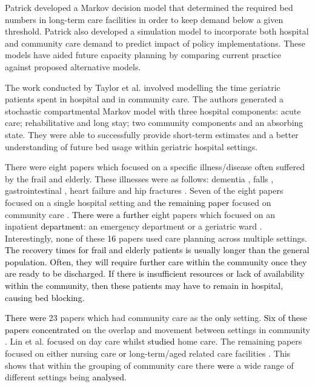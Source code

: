 \documentclass[../thesis.tex]{subfiles}
\begin{document}
Patrick \cite{Patrick} developed a Markov decision model that determined the required bed numbers in long-term care facilities in order to keep demand below a given threshold. Patrick also developed a simulation model to incorporate both hospital and community care demand to predict impact of policy implementations. These models have aided future capacity planning by comparing current practice against proposed alternative models.

The work conducted by Taylor et al. \cite{Taylor} involved modelling the time geriatric patients spent in hospital and in community care. The authors generated a stochastic compartmental Markov model with three hospital components: acute care; rehabilitative and long stay; two community components and an absorbing state. They were able to successfully provide short-term estimates and a better understanding of future bed usage within geriatric hospital settings.

There were eight papers which focused on a specific illness/disease often suffered by the frail and elderly. These illnesses were as follows: dementia \cite{Cepoiu}, falls \cite{Franklin}, gastrointestinal \cite{Abe}, heart failure \cite{Azad, Kul, Shaw} and hip fractures \cite{Beaupre, Wallace}. Seven of the eight papers focused on a single hospital setting and \textcolor{black}{the remaining paper} focused on community care \cite{Cepoiu}. \textcolor{black}{There were a further} eight papers which focused on an inpatient \textcolor{black}{department}\textcolor{black}{:} an emergency department \cite{Patrick, Rashwan, Rossille,Trevisan} or a geriatric ward \cite{Christodoulou, Franck, Gorunescu,Marshall3}. Interestingly, none of these \textcolor{black}{16} papers used care planning across multiple settings. \textcolor{black}{The recovery times for frail and elderly patients is usually longer than the general population. Often, they will require further care within the community once they are ready to be discharged. If there is insufficient resources or lack of availability within the community, then these patients may have to remain in hospital, causing bed blocking.}


\textcolor{black}{There were} 23 papers which had community care as the \textcolor{black}{only} setting.  \textcolor{black}{Six of these papers concentrated} on the overlap and movement between settings in community \cite{Bae, Gassoumis, YLi,Bidhandi,Welberry, Zhang1}. Lin et al. \cite{Lin} focused on day care whilst \cite{Eveborn, Grenouilleau, Guo, Yalcindag} \textcolor{black}{studied} home care. The remaining papers focused on either nursing care \cite{Arling,Borowiak, Muramatsu} \textcolor{black}{or} long-term/aged related care facilities \cite{Ambagtsheer, Arvelo, Cepoiu, Desai, Eggink, Katsaliaki, Kerpershoek, Tao, Xie}. This shows that within the grouping of community care there \textcolor{black}{were} a wide range of different settings being \textcolor{black}{analysed}.
\end{document}
